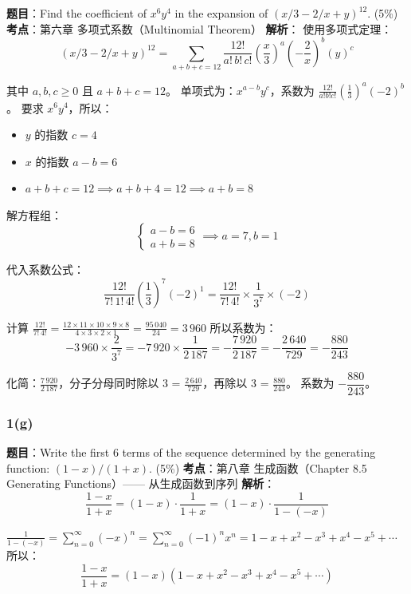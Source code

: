 \documentclass[10pt,a4paper,openany]{ctexbook}
\theoremstyle{definition}
\theoremstyle{remark}
\begin{document}
\textbf{题目}：Find the coefficient of $x^6 y^4$ in the expansion of $(x/3 - 2/x + y)^{12}$. (5\%)
\textbf{考点}：第六章 多项式系数（Multinomial Theorem）
\textbf{解析}：
使用多项式定理：
\[
(x/3 - 2/x + y)^{12} = \sum_{a+b+c=12} \frac{12!}{a!\,b!\,c!} \left(\frac{x}{3}\right)^a \left(-\frac{2}{x}\right)^b (y)^c
\]

其中 $a,b,c \geq 0$ 且 $a + b + c = 12$。
单项式为：$x^{a-b} y^c$，系数为 $\frac{12!}{a!b!c!} \left(\frac{1}{3}\right)^a (-2)^b$。
要求 $x^6 y^4$，所以：
\begin{itemize}
\item $y$ 的指数 $c = 4$
\item $x$ 的指数 $a - b = 6$
\item $a + b + c = 12 \implies a + b + 4 = 12 \implies a + b = 8$

\end{itemize}

解方程组：
\[
\begin{cases}
a - b = 6 \\
a + b = 8
\end{cases}
\implies a = 7, b = 1
\]

代入系数公式：
\[
\frac{12!}{7!\,1!\,4!} \left(\frac{1}{3}\right)^7 (-2)^1 = \frac{12!}{7!\,4!} \times \frac{1}{3^7} \times (-2)
\]

计算 $\frac{12!}{7!\,4!} = \frac{12 \times 11 \times 10 \times 9 \times 8}{4 \times 3 \times 2 \times 1} = \frac{95\,040}{24} = 3\,960$
所以系数为：
\[
-3\,960 \times \frac{2}{3^7} = -7\,920 \times \frac{1}{2\,187} = -\frac{7\,920}{2\,187} = -\frac{2\,640}{729} = -\frac{880}{243}
\]

化简：$\frac{7\,920}{2\,187}$，分子分母同时除以 3 = $\frac{2\,640}{729}$，再除以 3 = $\frac{880}{243}$。
系数为 \textbf{$-\dfrac{880}{243}$}。
\subsubsection{1(g)}

\textbf{题目}：Write the first 6 terms of the sequence determined by the generating function: $(1-x)/(1+x)$. (5\%)
\textbf{考点}：第八章 生成函数（Chapter 8.5 Generating Functions）—— 从生成函数到序列
\textbf{解析}：
\[
\frac{1-x}{1+x} = (1-x) \cdot \frac{1}{1+x} = (1-x) \cdot \frac{1}{1-(-x)}
\]

$\frac{1}{1-(-x)} = \sum_{n=0}^{\infty} (-x)^n = \sum_{n=0}^{\infty} (-1)^n x^n = 1 - x + x^2 - x^3 + x^4 - x^5 + \cdots$
所以：
\[
\frac{1-x}{1+x} = (1-x)(1 - x + x^2 - x^3 + x^4 - x^5 + \cdots)
\]
\end{document}
